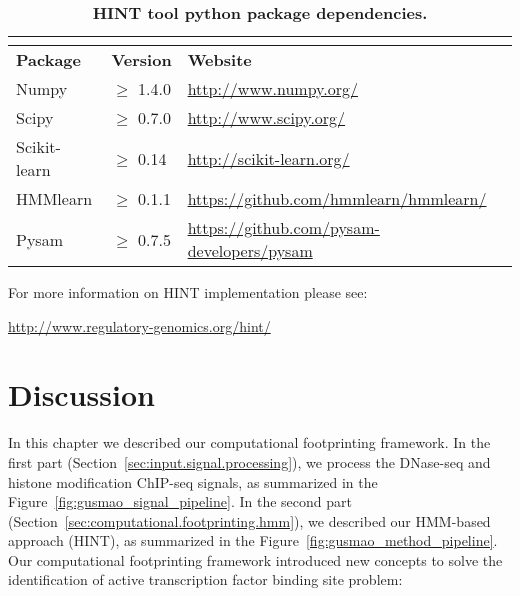 \begin{longtable}{>{\raggedright\arraybackslash}p{2.5cm}>{\raggedright\arraybackslash}p{1.2cm}>{\raggedright\arraybackslash}p{9.8cm}}
\caption[HINT tool python package dependencies]{\textbf{HINT tool python package dependencies.}} \\
\label{tab:package.dependency} \\
  \hline
  \textbf{Package} & \textbf{Version} & \textbf{Website} \\
  \hline
  Numpy & $\geq$ 1.4.0 & \url{http://www.numpy.org/} \\
  Scipy & $\geq$ 0.7.0 & \url{http://www.scipy.org/} \\
  Scikit-learn & $\geq$ 0.14 & \url{http://scikit-learn.org/} \\
  HMMlearn & $\geq$ 0.1.1 & \url{https://github.com/hmmlearn/hmmlearn/} \\
  Pysam & $\geq$ 0.7.5 & \url{https://github.com/pysam-developers/pysam} \\
  \hline
\end{longtable}

For more information on HINT implementation please see:

\begin{center}
\url{http://www.regulatory-genomics.org/hint/}
\end{center}


\section{Discussion}
\label{sec:discussion.3}

In this chapter we described our computational footprinting framework. In the first part (Section~\ref{sec:input.signal.processing}), we process the DNase-seq and histone modification ChIP-seq signals, as summarized in the Figure~\ref{fig:gusmao_signal_pipeline}. In the second part (Section~\ref{sec:computational.footprinting.hmm}), we described our HMM-based approach (HINT), as summarized in the Figure~\ref{fig:gusmao_method_pipeline}. Our computational footprinting framework introduced new concepts to solve the identification of active transcription factor binding site problem:

